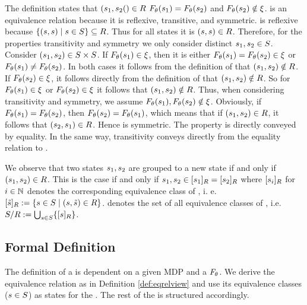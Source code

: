 \documentclass[preview]{standalone}
\begin{document}
The definition states that $({s}_1, {s}_2() \in {R}$ \iffN ${F_{{\theta}}}({s}_1) = {F_{{\theta}}}({s}_2)$ and ${F_{{\theta}}}({s}_2) \notin {\xi}$. \eqrelview is an equivalence relation because it is reflexive, transitive, and symmetric. \eqrelview is reflexive because $\{({s}, {s}) \mid {s} \in {S}\} \subseteq {R}$. Thus for all states \state it is $({s}, {s}) \in {R}$. Therefore, for the properties transitivity and symmetry we only consider distinct ${s}_1, {s}_2 \in {S}$. Consider $({s}_1, {s}_2) \in {S} \times {S}$. If ${F_{{\theta}}}({s}_1) \in {\xi}$, then it is either ${F_{{\theta}}}({s}_1) = {F_{{\theta}}}({s}_2) \in {\xi}$ or ${F_{{\theta}}}({s}_1) \neq {F_{\ensuremath{{\theta}}}}({s}_2)$. In both cases it follows from the definition of \eqrelview that $({s}_1, {s}_2) \notin {R}$. If ${F_{{\theta}}}({s}_2) \in {\xi}$, it follows directly from the definition of \eqrelview that $({s}_1, {s}_2) \notin {R}$. So for ${F_{{\theta}}}({s}_1) \in {\xi}$ or ${F_{{\theta}}}({s}_2) \in {\xi}$ it follows that $({s}_1, {s}_2) \notin {R}$. Thus, when considering transitivity and symmetry, we assume ${F_{{\theta}}}({s}_1), {F_{{\theta}}}({s}_2) \notin {\xi}$. Obviously, if ${F_{{\theta}}}({s}_1) = {F_{{\theta}}}({s}_2)$, then ${F_{{\theta}}}({s}_2) = {F_{{\theta}}}({s}_1)$, which means that if $({s}_1, {s}_2) \in {R}$, it follows that $({s}_2, {s}_1) \in {R}$. Hence \eqrelview is symmetric. The property is directly conveyed by equality. In the same way, transitivity conveys directly from the equality relation to \eqrelview.

We observe that two states ${s}_1, {s}_2$ are grouped to a new state if and only if $({s}_1, {s}_2) \in {R}$. This is the case if and only if ${s}_1, {s}_2 \in {\ensuremath{{[{s}_1]_{{R}}}}} = {{[{s}_2]_{{R}}}}$ where ${{[{s}_i]_{{R}}}}$ for $i \in {\mathbb{N}}$ denotes the corresponding equivalence class of \eqrelview, i. e. ${{[{\tilde{{s}}}]_{{R}}}} := \{{s} \in {S} \mid ({s},{\tilde{{s}}}) \in {R}\}$. \eqclasssetv denotes the set of all equivalence classes of \eqrelview, i.e. ${{{S}}/{R}} := \bigcup_{{s} \in {S}}\{{{[{s}]_{{R}}}}\}$.

\subsection{Formal Definition}

The definition of a \viewN is dependent on a given MDP and a \grpfctN ${F_{{\theta}}}$. We derive the equivalence relation \eqrelview as in Definition \ref{def:eqrelview} and use its equivalence classes \eqclassv (${s} \in {S}$) as states for the \viewN. The rest of the \chgphN is structured accordingly.
\end{document}

